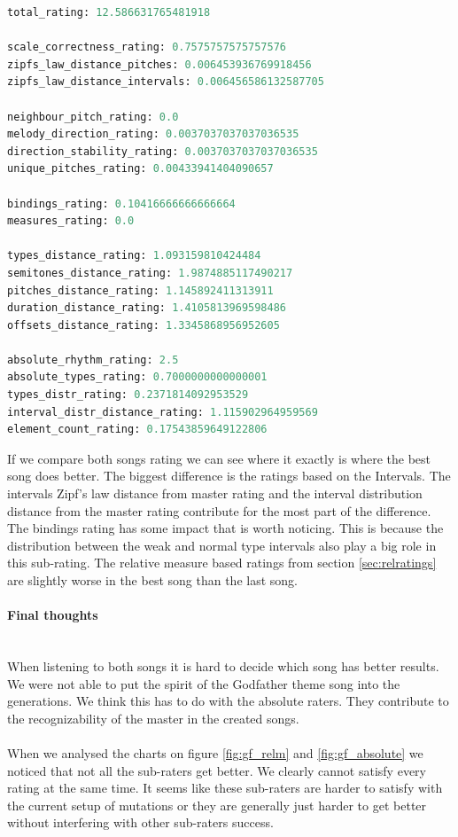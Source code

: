 \documentclass[a4paper]{article}
\begin{document}
\begin{lstlisting}[language=Python,caption={Best gen song's ratings.},captionpos=b,label=code:best_song_scores]
total_rating: 12.586631765481918

scale_correctness_rating: 0.7575757575757576
zipfs_law_distance_pitches: 0.006453936769918456
zipfs_law_distance_intervals: 0.006456586132587705

neighbour_pitch_rating: 0.0
melody_direction_rating: 0.0037037037037036535
direction_stability_rating: 0.0037037037037036535
unique_pitches_rating: 0.00433941404090657

bindings_rating: 0.10416666666666664
measures_rating: 0.0

types_distance_rating: 1.093159810424484
semitones_distance_rating: 1.9874885117490217
pitches_distance_rating: 1.145892411313911
duration_distance_rating: 1.4105813969598486
offsets_distance_rating: 1.3345868956952605

absolute_rhythm_rating: 2.5
absolute_types_rating: 0.7000000000000001
types_distr_rating: 0.2371814092953529
interval_distr_distance_rating: 1.115902964959569
element_count_rating: 0.17543859649122806

\end{lstlisting}

If we compare both songs rating we can see where it exactly is where the best song does better. The biggest difference is the ratings based on the Intervals. The intervals Zipf's law distance from master rating and the interval distribution distance from the master rating contribute for the most part of the difference. The bindings rating has some impact that is worth noticing. This is because the distribution between the weak and normal type intervals also play a big role in this sub-rating. The relative measure based ratings from section \ref{sec:relratings} are slightly worse in the best song than the last song. 

\paragraph{Final thoughts}\mbox{}\\
When listening to both songs it is hard to decide which song has better results. We were not able to put the spirit of the Godfather theme song into the generations. We think this has to do with the absolute raters. They contribute to the recognizability of the master in the created songs. 
\\\\
When we analysed the charts on figure \ref{fig:gf_relm} and \ref{fig:gf_absolute} we noticed that not all the sub-raters get better. We clearly cannot satisfy every rating at the same time. It seems like these sub-raters are harder to satisfy with the current setup of mutations or they are generally just harder to get better without interfering with other sub-raters success.
\end{document}
